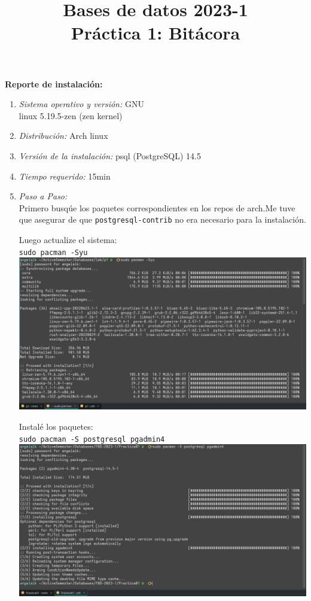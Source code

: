 \documentclass[12pt,a4paper]{article}
\title{Bases de datos 2023-1\\
Práctica 1: Bitácora}
\begin{document}
\maketitle

\textbf{Reporte de instalación:}\\
\begin{enumerate}
	\item \textit{Sistema operativo y versión:} GNU\\linux 5.19.5-zen (zen kernel)\\

	\item \textit{Distribución:} Arch linux\\

	\item \textit{Versión de la instalación:} psql (PostgreSQL) 14.5\\

	\item \textit{Tiempo requerido:} 15min\\

	\item \textit{Paso a Paso:}\\
		Primero busqúe los paquetes correspondientes en los repos de
		arch.Me tuve que asegurar de que \texttt{postgresql-contrib}
		no era necesario para la instalación.

		Luego actualize el sistema:\\
		\texttt{sudo pacman -Syu}\\
		\includegraphics[scale=0.3]{assets/01-angel.png}

		Instalé los paquetes:\\
		\texttt{sudo pacman -S postgresql pgadmin4}\\
		\includegraphics[scale=0.3]{assets/02-angel.png}


\end{enumerate}
\end{document}
